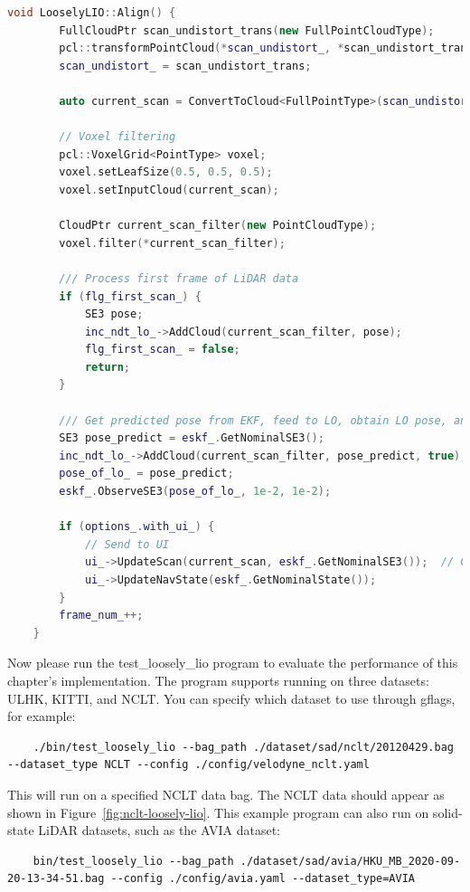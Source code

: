 \begin{lstlisting}[language=c++,caption=src/ch7/loosely_coupled_lio/loosly_lio.cc]
	void LooselyLIO::Align() {
		FullCloudPtr scan_undistort_trans(new FullPointCloudType);
		pcl::transformPointCloud(*scan_undistort_, *scan_undistort_trans, TIL_.matrix());
		scan_undistort_ = scan_undistort_trans;
		
		auto current_scan = ConvertToCloud<FullPointType>(scan_undistort_);
		
		// Voxel filtering
		pcl::VoxelGrid<PointType> voxel;
		voxel.setLeafSize(0.5, 0.5, 0.5);
		voxel.setInputCloud(current_scan);
		
		CloudPtr current_scan_filter(new PointCloudType);
		voxel.filter(*current_scan_filter);
		
		/// Process first frame of LiDAR data
		if (flg_first_scan_) {
			SE3 pose;
			inc_ndt_lo_->AddCloud(current_scan_filter, pose);
			flg_first_scan_ = false;
			return;
		}
		
		/// Get predicted pose from EKF, feed to LO, obtain LO pose, and finally integrate into EKF
		SE3 pose_predict = eskf_.GetNominalSE3();
		inc_ndt_lo_->AddCloud(current_scan_filter, pose_predict, true);
		pose_of_lo_ = pose_predict;
		eskf_.ObserveSE3(pose_of_lo_, 1e-2, 1e-2);
		
		if (options_.with_ui_) {
			// Send to UI
			ui_->UpdateScan(current_scan, eskf_.GetNominalSE3());  // Convert to Lidar Pose for UI
			ui_->UpdateNavState(eskf_.GetNominalState());
		}
		frame_num_++;
	}
\end{lstlisting}

Now please run the test\_loosely\_lio program to evaluate the performance of this chapter's implementation. The program supports running on three datasets: ULHK, KITTI, and NCLT. You can specify which dataset to use through gflags, for example:
\begin{lstlisting}
	./bin/test_loosely_lio --bag_path ./dataset/sad/nclt/20120429.bag --dataset_type NCLT --config ./config/velodyne_nclt.yaml
\end{lstlisting}

This will run on a specified NCLT data bag. The NCLT data should appear as shown in Figure~\ref{fig:nclt-loosely-lio}. This example program can also run on solid-state LiDAR datasets, such as the AVIA dataset:

\begin{lstlisting}
	bin/test_loosely_lio --bag_path ./dataset/sad/avia/HKU_MB_2020-09-20-13-34-51.bag --config ./config/avia.yaml --dataset_type=AVIA
\end{lstlisting}

